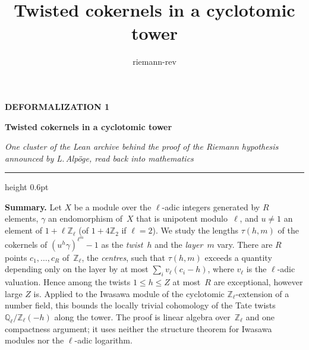 \documentclass[11pt,a4paper]{article}
\title{Twisted cokernels in a cyclotomic tower}
\author{riemann-rev}
\date{}
\newcommand{\Q}{\mathbb{Q}}
\newcommand{\Z}{\mathbb{Z}}
\newcommand{\QZ}{\Q_\ell/\Z_\ell}
\newcommand{\kw}[1]{\emph{#1}}
\newcommand{\m}[1]{\mbox{$#1$}}        %
\theoremstyle{plainx}
\theoremstyle{uprightx}
\begin{document}
\color{ink}

{\raggedright
{\sffamily\bfseries\fontsize{7.2}{9}\selectfont\color{leancol}DEFORMALIZATION 1\par}
\vspace{5pt}
{\fontsize{21.5}{25.5}\selectfont\bfseries Twisted cokernels in a cyclotomic tower\par}
\vspace{5pt}
{\fontsize{12.4}{16}\selectfont\itshape\color{inksoft} One cluster of the Lean archive behind the proof of the Riemann
hypothesis announced by L.\,Alpöge, read back into mathematics\par}}
\vspace{8pt}
{\color{rulegrey}\hrule height 0.6pt}
\vspace{7pt}
\thispagestyle{empty}

\textbf{Summary.} Let $X$ be a module over the $\ell$-adic integers generated by $R$ elements, $\gamma$ an
endomorphism of~$X$ that is unipotent modulo~$\ell$, and \m{u\ne1} an element of \m{1+\ell\Z_\ell} (of
\m{1+4\Z_2} if \m{\ell=2}). We study the lengths $\tau(h,m)$ of
the cokernels of $(u^h\gamma)^{\ell^m}-1$ as the \kw{twist}~$h$ and the \kw{layer}~$m$ vary. There are $R$ points
\m{c_1,\dots,c_R} of~$\Z_\ell$, the \kw{centres}, such that $\tau(h,m)$ exceeds a quantity depending only on the layer by at most
$\sum_i v_\ell(c_i-h)$, where $v_\ell$ is the $\ell$-adic valuation. Hence among the twists \m{1\le h\le Z} at most~$R$ are exceptional, however large $Z$ is.
Applied to the Iwasawa module of the cyclotomic $\Z_\ell$-extension of a number field, this bounds the locally
trivial cohomology of the Tate twists $\QZ(-h)$ along the tower. The proof is linear algebra over~$\Z_\ell$ and one
compactness argument; it uses neither the structure theorem for Iwasawa modules nor the $\ell$-adic logarithm.
\end{document}
